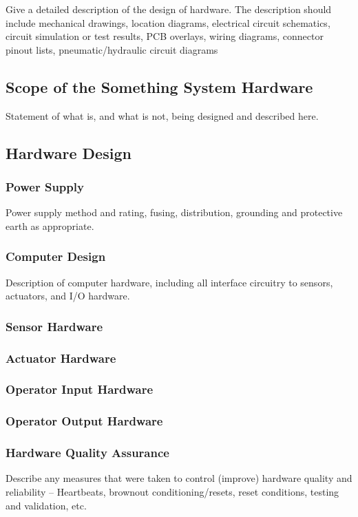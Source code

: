 \documentclass[MTRX3700report.tex]{subfiles}
\begin{document}
Give a detailed description of the design of hardware. The description should include mechanical drawings, location diagrams, electrical circuit schematics, circuit simulation or test results, PCB overlays, wiring diagrams, connector pinout lists, pneumatic/hydraulic circuit diagrams

\subsection{Scope of the Something System Hardware}
Statement of what is, and what is not, being designed and described here.
\subsection{Hardware Design}
\subsubsection{Power Supply}
Power supply method and rating, fusing, distribution, grounding and protective earth as appropriate.
\subsubsection{Computer Design}
Description of computer hardware, including all interface circuitry to sensors, actuators, and I/O hardware.
\subsubsection{Sensor Hardware}
\subsubsection{Actuator Hardware}
\subsubsection{Operator Input Hardware}
\subsubsection{Operator Output Hardware}
\subsubsection{Hardware Quality Assurance}
Describe any measures that were taken to control (improve) hardware quality and reliability – Heartbeats, brownout conditioning/resets, reset conditions, testing and validation, etc.
\end{document}
